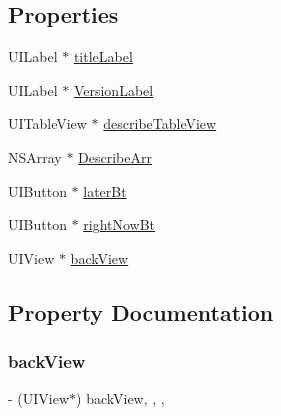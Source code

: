 \subsection*{Properties}
\begin{DoxyCompactItemize}
\item 
U\+I\+Label $\ast$ \mbox{\hyperlink{category_q_j_version_update_v_iew_07_08_a3cb7a16061ba6af08816c63ba112aae2}{title\+Label}}
\item 
U\+I\+Label $\ast$ \mbox{\hyperlink{category_q_j_version_update_v_iew_07_08_a3d4b5d7507622c03530df081f5d4b544}{Version\+Label}}
\item 
U\+I\+Table\+View $\ast$ \mbox{\hyperlink{category_q_j_version_update_v_iew_07_08_ac9496bee33711bb9640863d39d202ffd}{describe\+Table\+View}}
\item 
N\+S\+Array $\ast$ \mbox{\hyperlink{category_q_j_version_update_v_iew_07_08_aa8c1c9a67b4836232fbb3a0df5f2cd6b}{Describe\+Arr}}
\item 
U\+I\+Button $\ast$ \mbox{\hyperlink{category_q_j_version_update_v_iew_07_08_a701d2d9558798aeb35130ea6d4a706c1}{later\+Bt}}
\item 
U\+I\+Button $\ast$ \mbox{\hyperlink{category_q_j_version_update_v_iew_07_08_af83b807637d0201d3dc1c5d1590ecaf1}{right\+Now\+Bt}}
\item 
U\+I\+View $\ast$ \mbox{\hyperlink{category_q_j_version_update_v_iew_07_08_a86e6c93dbd952dd4d764675847c3a74c}{back\+View}}
\end{DoxyCompactItemize}


\subsection{Property Documentation}
\mbox{\label{category_q_j_version_update_v_iew_07_08_a86e6c93dbd952dd4d764675847c3a74c}} 
\subsubsection{\texorpdfstring{back\+View}{backView}}
{\footnotesize\ttfamily -\/ (U\+I\+View$\ast$) back\+View\hspace{0.3cm}{\ttfamily [read]}, {\ttfamily [write]}, {\ttfamily [nonatomic]}, {\ttfamily [strong]}}

